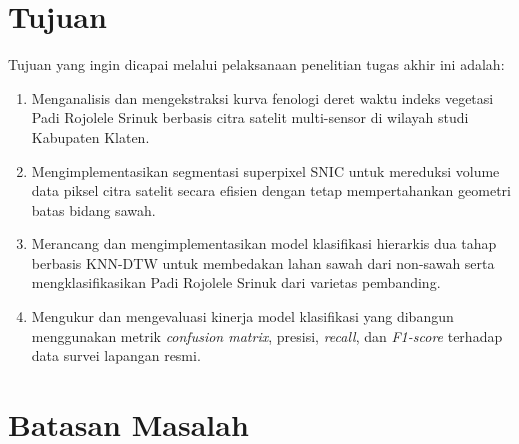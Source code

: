 \section{Tujuan}
\label{sec:tujuan}

Tujuan yang ingin dicapai melalui pelaksanaan penelitian tugas akhir ini adalah:
\begin{enumerate}
    \item Menganalisis dan mengekstraksi kurva fenologi deret waktu indeks vegetasi Padi Rojolele Srinuk berbasis citra satelit multi-sensor di wilayah studi Kabupaten Klaten.
    \item Mengimplementasikan segmentasi superpixel SNIC untuk mereduksi volume data piksel citra satelit secara efisien dengan tetap mempertahankan geometri batas bidang sawah.
    \item Merancang dan mengimplementasikan model klasifikasi hierarkis dua tahap berbasis KNN-DTW untuk membedakan lahan sawah dari non-sawah serta mengklasifikasikan Padi Rojolele Srinuk dari varietas pembanding.
    \item Mengukur dan mengevaluasi kinerja model klasifikasi yang dibangun menggunakan metrik \textit{confusion matrix}, presisi, \textit{recall}, dan \textit{F1-score} terhadap data survei lapangan resmi.
\end{enumerate}

\section{Batasan Masalah}
\label{sec:batasan_masalah}

